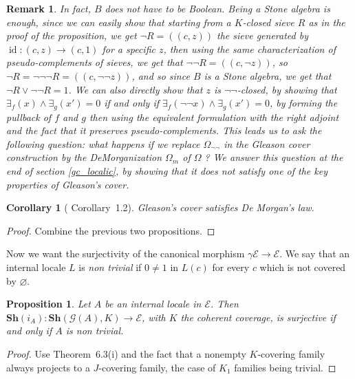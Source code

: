 \documentclass{article}
\newtheorem{corollary}[theorem]{Corollary}
\newtheorem{remark}[theorem]{Remark}
\newtheorem{proposition}[theorem]{Proposition}
\newcommand{\id}{\operatorname{id}}
\begin{document}
\begin{remark}\label{dml_ideals}
    In fact, $B$ does not have to be Boolean. Being a Stone algebra is enough, since we can easily show that starting from a $K$-closed sieve $R$ as in the proof of the proposition, we get $\neg R=((c,z))$ the sieve generated by $\id:(c,z)\xrightarrow{}(c,1)$ for a specific $z$, then using the same characterization of pseudo-complements of sieves, we get that $\neg \neg R=((c,\neg z))$, so $\neg R=\neg\neg\neg R=((c,\neg \neg z))$, and so since $B$ is a Stone algebra, we get that $\neg R\lor \neg\neg R=1$. We can also directly show that $z$ is $\neg\neg$-closed, by showing that $\exists_f(x)\land\exists_g(x')=0$ if and only if $\exists_f(\neg\neg x)\land\exists_g(x')=0$, by forming the pullback of $f$ and $g$ then using the equivalent formulation with the right adjoint and the fact that it preserves pseudo-complements. This leads us to ask the following question: what happens if we replace $\Omega_{\neg\neg}$ in the Gleason cover construction by the DeMorganization $\Omega_m$ of $\Omega$ \cite{caramello2009morgan}? We answer this question at the end of section \ref{gc_localic}, by showing that it does not satisfy one of the key properties of Gleason's cover.
\end{remark}

\begin{corollary}[\cite{johnstone1980gleason} Corollary~1.2]
    Gleason's cover satisfies De Morgan's law.
\end{corollary}
\begin{proof}
    Combine the previous two propositions.
\end{proof}

Now we want the surjectivity of the canonical morphism $\gamma\mathcal{E}\xrightarrow{}\mathcal{E}$. We say that an internal locale $L$ is \emph{non trivial} if $0\ne 1$ in $L(c)$ for every $c$ which is not covered by $\varnothing$. 

\begin{proposition}\label{surj_gc}
    Let $A$ be an internal locale in $\mathcal{E}$. Then $\mathbf{Sh}(i_A):\mathbf{Sh}(\mathcal{G}(A),K)\xrightarrow{}\mathcal{E}$, with $K$ the coherent coverage, is surjective if and only if $A$ is non trivial.
\end{proposition}
\begin{proof}
    Use \cite{caramello2019denseness} Theorem~6.3(i) and the fact that a nonempty $K$-covering family always projects to a $J$-covering family, the case of $K_1$ families being trivial.
\end{proof}
\end{document}
